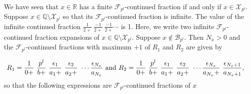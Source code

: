 \documentclass[12pt]{elsarticle}
\theoremstyle{definition}
\newcommand{\field}[1]{\mathbb{#1}}          \newcommand{\Q}{\field{Q}}
\newcommand{\R}{\field{R}}                   \newcommand{\Z}{\field{Z}}
\newcommand{\mX}{{\mathcal X}}
\newcommand{\f}{{\mathcal F}}
\newcommand{\ep}{\epsilon}
\begin{document}
{ 

  
  \begin{remark}  \label{longest cf1}  We have seen that $x\in\R$ has a finite $\f_{p^l}$-continued fraction if and only if $x\in\mX_{p^l}.$  Suppose $x\in\Q\setminus\mX_{p^l}$ so that its $\f_{p^l}$-continued fraction is infinite. The value of the infinite continued fraction $\frac{1}{2+}~\frac{-1}{2+}~\frac{-1}{2+}\cdots$ is 1. Here, we write two infinite $\f_{p^l}$-continued fraction expansions of $x\in\Q\setminus\mX_{p^l}.$ Suppose $x\not\in\mathcal{B}_{p^l}$. Then $N_x>0$ and the $\f_{p^l}$-continued fractions with maximum $+1$ of $R_1$ and $R_2$ are given by
  
  $$	R_1= \frac{1}{0+}~\frac{p^l}{b+}~\frac{\epsilon_{1} }{a_{1}+}~\frac{\epsilon_{2}}{a_{2}+}~\cdots\frac{\epsilon_{N_x}}{a_{N_x}} {\text{ and }}
  	R_2= \frac{1}{0+}~\frac{p^l}{b+}~\frac{\epsilon_{1} }{a_{1}+}~\frac{\epsilon_{2}}{a_{2}+}~\cdots\frac{\epsilon_{N_x}}{a_{N_x}+}~\frac{\ep_{N_x+1}}{a_{N_x+1}},\\
  $$
  	so that the following expressions are  $\f_{p^l}$-continued fractions of $x$
  	

\end{remark}}
\end{document}
